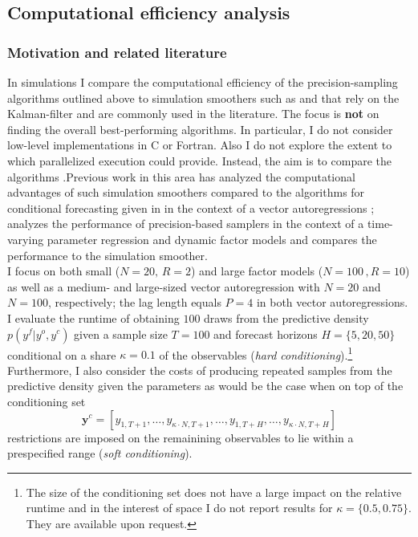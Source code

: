 \documentclass[notitlepage,a4paper,12pt]{article}
\begin{document}
\begin{ThreePartTable}
\section{Computational efficiency analysis}

\subsubsection{Motivation and related literature}

In simulations I compare the computational efficiency of the precision-sampling algorithms outlined above to simulation smoothers such as \citet{carterkohn1994_biomtr} and \citet{durbinkoopman2002_biomtr} that rely on the Kalman-filter and are commonly used in the literature. The focus is \textbf{not} on finding the overall best-performing algorithms. In particular, I do not consider low-level implementations in C or Fortran. Also I do not explore the extent to which parallelized execution could provide. Instead, the aim is to compare the algorithms .Previous work in this area has analyzed the computational advantages of such simulation smoothers compared to the algorithms for conditional forecasting given in \citet{waggonerzha1999_res} in the context of a vector autoregressions \citep{bgl_2015ijf}; \citet{mmp2011_csda} analyzes the performance of precision-based samplers in the context of a time-varying parameter regression and dynamic factor models and compares the performance to the \citet{durbinkoopman2002_biomtr} simulation smoother.\\

I focus on both small ($N=20,\,R=2$) and large factor models ($N=100\,,R=10$) as well as a medium- and large-sized vector autoregression with $N=20$ and $N=100$, respectively; the lag length equals $P=4$ in both vector autoregressions. I evaluate the runtime of obtaining $100$ draws from the predictive density $p(y^f|y^o, y^c)$ given a sample size $T=100$ and forecast horizons $H = \{5, 20, 50\}$ conditional on a share $\kappa = 0.1$ of the observables (\textit{hard conditioning}).\footnote{The size of the conditioning set does not have a large impact on the relative runtime and in the interest of space I do not report results for $\kappa = \{0.5, 0.75\}$. They are available upon request.} Furthermore, I also consider the costs of producing repeated samples from the predictive density given the parameters as would be the case when on top of the conditioning set $$\mathbf{y}^{c} = [y_{1, T+1}, \dots, y_{\kappa \cdot N, T+1}, \dots, y_{1,T+H}, \dots, y_{\kappa \cdot N, T+H}]$$ restrictions are imposed on the remainining observables to lie within a prespecified range (\textit{soft conditioning}). 


\end{ThreePartTable}
\end{document}
